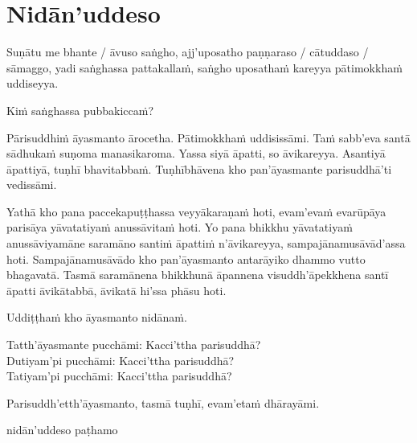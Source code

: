 \section{Nidān'uddeso}
\label{nidan'uddeso}

Suṇātu me bhante / āvuso saṅgho, ajj'uposatho paṇṇaraso / cātuddaso / sāmaggo, yadi saṅghassa pattakallaṁ, saṅgho uposathaṁ kareyya pātimokkhaṁ uddiseyya.

Kiṁ saṅghassa pubbakiccaṁ?

Pārisuddhiṁ āyasmanto ārocetha. Pātimokkhaṁ uddisissāmi. Taṁ sabb'eva santā sādhukaṁ suṇoma manasikaroma. Yassa siyā āpatti, so āvikareyya. Asantiyā āpattiyā, tuṇhī bhavitabbaṁ. Tuṇhībhāvena kho pan'āyasmante parisuddhā'ti vedissāmi.

Yathā kho pana paccekapuṭṭhassa veyyākaraṇaṁ hoti, evam'evaṁ evarūpāya parisāya yāvatatiyaṁ anussāvitaṁ hoti. Yo pana bhikkhu yāvatatiyaṁ anussāviyamāne saramāno santiṁ āpattiṁ n'āvikareyya, sampajānamusāvād'assa hoti. Sampajānamusāvādo kho pan'āyasmanto antarāyiko dhammo vutto bhagavatā. Tasmā saramānena bhikkhunā āpannena visuddh'āpekkhena santī āpatti āvikātabbā, āvikatā hi'ssa phāsu hoti.

\medskip

\begin{center}
Uddiṭṭhaṁ kho āyasmanto nidānaṁ.\makeatletter\hyperlink{endnote8-appendix}\makeatother

\smallskip

Tatth'āyasmante pucchāmi: Kacci'ttha parisuddhā?\\
Dutiyam'pi pucchāmi: Kacci'ttha parisuddhā?\\
Tatiyam'pi pucchāmi: Kacci'ttha parisuddhā?

\smallskip

Parisuddh'etth'āyasmanto, tasmā tuṇhī, evam'etaṁ dhārayāmi.
\end{center}

\begin{outro}
  nidān'uddeso paṭhamo\makeatletter\hyperlink{endnote9-appendix}\makeatother
\end{outro}

\clearpage

